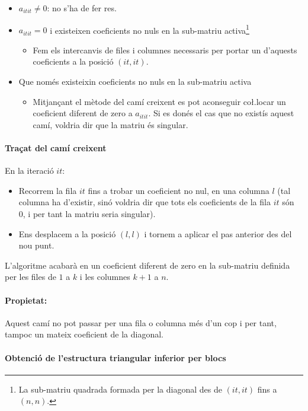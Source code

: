 \documentclass[11pt,a4paper,twoside]{report}
\begin{document}
\begin{itemize}
\item $a_{it it} \neq 0$: no s'ha de fer res.
\item  $a_{it it} = 0$ i existeixen coeficients no nuls en la sub-matriu activa\footnote{La sub-matriu quadrada formada per la diagonal des de $(it,it)$ fins a $(n,n)$.}
\begin{itemize}
\item Fem els intercanvis de files i columnes necessaris per portar un d'aquests coeficients a la posició $(it, it)$.
\end{itemize}
\item Que només existeixin coeficients no nuls en la sub-matriu activa\footnotemark[\value{footnote}]
\begin{itemize}
\item Mitjançant el mètode del camí creixent es pot aconseguir co\l.locar un coeficient diferent de zero a $a_{it it}$. Si es donés el cas que no existís aquest camí, voldria dir que la matriu és singular.
\end{itemize}
\end{itemize}

\paragraph{Traçat del camí creixent} \mbox{}

En la iteració $it$:
\begin{itemize}
\item Recorrem la fila $it$ fins a trobar un coeficient no nul, en una columna $l$ (tal columna ha d'existir, sinó voldria dir que tots els coeficients de la fila $it$ són 0, i per tant la matriu seria singular).
\item Ens desplacem a la posició $(l,l)$ i tornem a aplicar el pas anterior des del nou punt.
\end{itemize}
 
L'algoritme acabarà en un coeficient diferent de zero en la sub-matriu definida per les files de $1$ a $k$ i les columnes $k+1$ a $n$.

\paragraph*{Propietat:}Aquest camí no pot passar per una fila o columna més d'un cop i per tant, tampoc un mateix coeficient de la diagonal.

\paragraph{Obtenció de l'estructura triangular inferior per blocs} \mbox{}
\end{document}
